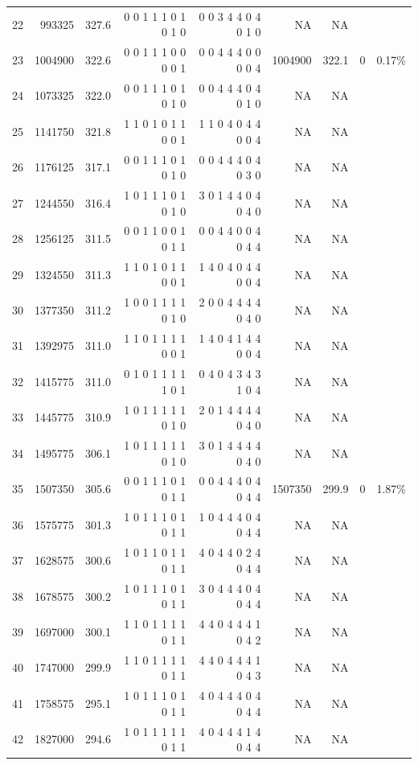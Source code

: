 \documentclass[10pt,journal,compsoc]{IEEEtran}
\begin{document}
\begin{table}[h]
{\begin{tabular}{|*{9}{r|}}
22	&993325	&   327.6	&0 0 1 1 1 0 1 0 1 0	&0 0 3 4 4 0 4 0 1 0	&			NA	&NA&&\\
23	&1004900&   322.6	&0 0 1 1 1 0 0 0 0 1	&0 0 4 4 4 0 0 0 0 4	&	\cellcolor{blizzardblue}       1004900	&\cellcolor{blizzardblue}322.1&\cellcolor{blizzardblue}	0	&\cellcolor{blizzardblue}0.17\%\\
24	&1073325&   322.0	&0 0 1 1 1 0 1 0 1 0	&0 0 4 4 4 0 4 0 1 0	&			NA	&NA&&\\
25	&1141750&   321.8	&1 1 0 1 0 1 1 0 0 1	&1 1 0 4 0 4 4 0 0 4	&			NA	&NA&&\\
26	&1176125&   317.1	&0 0 1 1 1 0 1 0 1 0	&0 0 4 4 4 0 4 0 3 0	&			NA	&NA&&\\
27	&1244550&   316.4	&1 0 1 1 1 0 1 0 1 0	&3 0 1 4 4 0 4 0 4 0	&			NA	&NA&&\\
28	&1256125&   311.5	&0 0 1 1 0 0 1 0 1 1	&0 0 4 4 0 0 4 0 4 4	&			NA	&NA&&\\
29	&1324550&   311.3	&1 1 0 1 0 1 1 0 0 1	&1 4 0 4 0 4 4 0 0 4	&			NA	&NA&&\\
30	&1377350&   311.2	&1 0 0 1 1 1 1 0 1 0	&2 0 0 4 4 4 4 0 4 0	&			NA	&NA&&\\
31	&1392975&   311.0	&1 1 0 1 1 1 1 0 0 1	&1 4 0 4 1 4 4 0 0 4	&			NA	&NA&&\\
32	&1415775&   311.0	&0 1 0 1 1 1 1 1 0 1	&0 4 0 4 3 4 3 1 0 4	&			NA	&NA&&\\
33	&1445775&   310.9	&1 0 1 1 1 1 1 0 1 0	&2 0 1 4 4 4 4 0 4 0	&			NA	&NA&&\\
34	&1495775&   306.1	&1 0 1 1 1 1 1 0 1 0	&3 0 1 4 4 4 4 0 4 0	&			NA	&NA&&\\
35	&1507350&   305.6	&0 0 1 1 1 0 1 0 1 1	&0 0 4 4 4 0 4 0 4 4	&	  \cellcolor{blizzardblue}     1507350	&\cellcolor{blizzardblue}299.9	&\cellcolor{blizzardblue}0	&\cellcolor{blizzardblue}1.87\%\\
36	&1575775&   301.3	&1 0 1 1 1 0 1 0 1 1	&1 0 4 4 4 0 4 0 4 4	&			NA	&NA&&\\
37	&1628575&   300.6	&1 0 1 1 0 1 1 0 1 1	&4 0 4 4 0 2 4 0 4 4	&			NA	&NA&&\\
38	&1678575&   300.2	&1 0 1 1 1 0 1 0 1 1	&3 0 4 4 4 0 4 0 4 4	&			NA	&NA&&\\
39	&1697000&   300.1	&1 1 0 1 1 1 1 0 1 1	&4 4 0 4 4 4 1 0 4 2	&			NA	&NA&&\\
40	&1747000&   299.9	&1 1 0 1 1 1 1 0 1 1	&4 4 0 4 4 4 1 0 4 3	&			NA	&NA&&\\
41	&1758575&   295.1	&1 0 1 1 1 0 1 0 1 1	&4 0 4 4 4 0 4 0 4 4	&			NA	&NA&&\\
42	&1827000&   294.6	&1 0 1 1 1 1 1 0 1 1	&4 0 4 4 4 1 4 0 4 4	&			NA	&NA&&\\

\end{tabular}}
\end{table}
\end{document}
